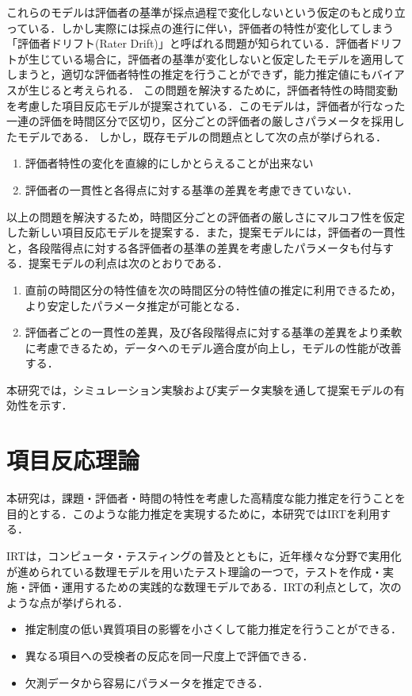 \documentclass[a4paper,11pt,oneside,openany]{jsbook}
\begin{document}
これらのモデルは評価者の基準が採点過程で変化しないという仮定のもと成り立っている．しかし実際には採点の進行に伴い，評価者の特性が変化してしまう「評価者ドリフト(Rater Drift)」と呼ばれる問題が知られている．評価者ドリフトが生じている場合に，評価者の基準が変化しないと仮定したモデルを適用してしまうと，適切な評価者特性の推定を行うことができず，能力推定値にもバイアスが生じると考えられる．
この問題を解決するために，評価者特性の時間変動を考慮した項目反応モデルが提案されている\cite{raterdrift}．このモデルは，評価者が行なった一連の評価を時間区分で区切り，区分ごとの評価者の厳しさパラメータを採用したモデルである．
しかし，既存モデルの問題点として次の点が挙げられる．
\begin{enumerate}
  \item 評価者特性の変化を直線的にしかとらえることが出来ない
  \item 評価者の一貫性と各得点に対する基準の差異を考慮できていない．
\end{enumerate}  
以上の問題を解決するため，時間区分ごとの評価者の厳しさにマルコフ性を仮定した新しい項目反応モデルを提案する．また，提案モデルには，評価者の一貫性と，各段階得点に対する各評価者の基準の差異を考慮したパラメータも付与する．提案モデルの利点は次のとおりである．
\begin{enumerate}
  \item 直前の時間区分の特性値を次の時間区分の特性値の推定に利用できるため，より安定したパラメータ推定が可能となる．
  \item 評価者ごとの一貫性の差異，及び各段階得点に対する基準の差異をより柔軟に考慮できるため，データへのモデル適合度が向上し，モデルの性能が改善する．
\end{enumerate}
本研究では，シミュレーション実験および実データ実験を通して提案モデルの有効性を示す．
\newpage

\chapter{項目反応理論}
本研究は，課題・評価者・時間の特性を考慮した高精度な能力推定を行うことを目的とする．このような能力推定を実現するために，本研究ではIRTを利用する．

IRTは，コンピュータ・テスティングの普及とともに，近年様々な分野で実用化が進められている数理モデルを用いたテスト理論の一つで，テストを作成・実施・評価・運用するための実践的な数理モデルである\cite{IRTtext,IRTLord}．IRTの利点として，次のような点が挙げられる\cite{IRTUtoUeno}．
\begin{itemize}
\item 推定制度の低い異質項目の影響を小さくして能力推定を行うことができる．
\item 異なる項目への受検者の反応を同一尺度上で評価できる．
\item 欠測データから容易にパラメータを推定できる．
\end{itemize}
\end{document}
